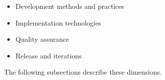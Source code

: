 \begin{itemize}
\item Development methods and practices
\item Implementation technologies
\item Quality assurance
\item Release and iterations
\end{itemize}

The following subsections describe these dimensions.




% 





% 
% 
